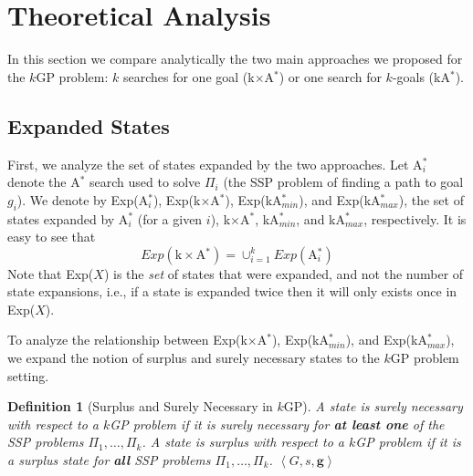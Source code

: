 \documentclass{aicom2e}
\newtheorem{definition}{Definition}
\newcommand{\kgs}{$k$GP}
\newcommand{\astar}{A$^*$}
\newcommand{\kastar}{kA$^*$}
\newcommand{\kastarmin}{kA$^*_{min}$}
\newcommand{\kastarmax}{kA$^*_{max}$}
\newcommand{\kxastar}{k$\times$A$^*$}
\newcommand{\astari}[1]{A$^*_#1$}
\newcommand{\tuple}[1]{\ensuremath{\left \langle #1 \right \rangle }}
\begin{document}
\section{Theoretical Analysis}
\label{sec:theoretical-analysis}

In this section we compare analytically the two main approaches we proposed for
the \kgs{} problem: $k$ searches for one goal (\kxastar{}) or one search for
$k$-goals (\kastar{}).

\subsection{Expanded States}
First, we analyze the set of states expanded by the two approaches.
Let \astari{i} denote   the \astar{} search used to solve $\Pi_i$ (the SSP problem of finding a path to goal $g_i$). 
We denote by Exp(\astari{i}), Exp(\kxastar{}), Exp(\kastarmin), and Exp(\kastarmax),
the set of states expanded by \astari{i} (for a given $i$), \kxastar{}, \kastarmin, and \kastarmax{}, respectively. 
It is easy to see that
\[ Exp(\text{\kxastar{}})=\cup_{i=1}^k Exp(\text{\astari{i}}) \]
Note that Exp($X$) is the {\em set} of states that were expanded, and not the number of state expansions, i.e., if a state is expanded twice then it will only exists once in Exp($X$). 


To analyze the relationship between Exp(\kxastar{}), Exp(\kastarmin), and Exp(\kastarmax), we expand the notion of surplus and surely necessary states to the \kgs{} problem setting. 
\begin{definition}[Surplus and Surely Necessary in \kgs{}]
	A state is surely necessary with respect to a \kgs{} problem 
	if it is surely necessary for {\bf at least one} of the SSP problems $\Pi_1,\ldots, \Pi_k$. 
	A state is surplus with respect to a \kgs{} problem 
	if it is a surplus state for {\bf all} SSP problems $\Pi_1,\ldots, \Pi_k$. 
	$\tuple{G,s, \textbf{g}}$
\label{def:surplus-k-goal}	
\end{definition}
	
\end{document}
